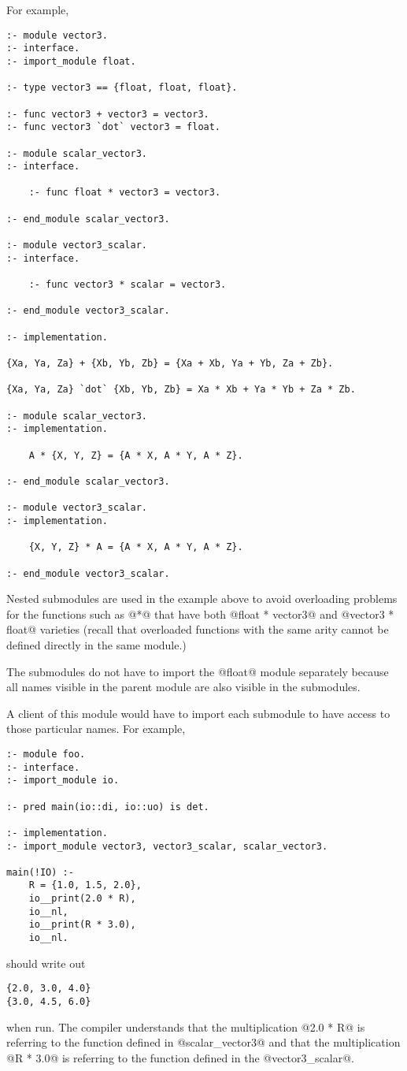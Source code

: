 For example,
\begin{verbatim}
:- module vector3.
:- interface.
:- import_module float.

:- type vector3 == {float, float, float}.

:- func vector3 + vector3 = vector3.
:- func vector3 `dot` vector3 = float.

:- module scalar_vector3.
:- interface.

    :- func float * vector3 = vector3.

:- end_module scalar_vector3.

:- module vector3_scalar.
:- interface.

    :- func vector3 * scalar = vector3.

:- end_module vector3_scalar.
    
:- implementation.

{Xa, Ya, Za} + {Xb, Yb, Zb} = {Xa + Xb, Ya + Yb, Za + Zb}.

{Xa, Ya, Za} `dot` {Xb, Yb, Zb} = Xa * Xb + Ya * Yb + Za * Zb.

:- module scalar_vector3.
:- implementation.

    A * {X, Y, Z} = {A * X, A * Y, A * Z}.

:- end_module scalar_vector3.

:- module vector3_scalar.
:- implementation.

    {X, Y, Z} * A = {A * X, A * Y, A * Z}.

:- end_module vector3_scalar.
\end{verbatim}
Nested submodules are used in the example above to avoid overloading
problems for the functions such as @*@ that have both @float * vector3@
and @vector3 * float@ varieties (recall that overloaded functions with
the same arity cannot be defined directly in the same module.)

The submodules do not have to import the @float@ module separately
because all names visible in the parent module are also visible in the
submodules.

A client of this module would have to import each submodule to have
access to those particular names.  For example,
\begin{verbatim}
:- module foo.
:- interface.
:- import_module io.

:- pred main(io::di, io::uo) is det.

:- implementation.
:- import_module vector3, vector3_scalar, scalar_vector3.

main(!IO) :-
    R = {1.0, 1.5, 2.0},
    io__print(2.0 * R),
    io__nl,
    io__print(R * 3.0),
    io__nl.
\end{verbatim}
should write out
\begin{verbatim}
{2.0, 3.0, 4.0}
{3.0, 4.5, 6.0}
\end{verbatim}
when run.  The compiler understands that the multiplication @2.0 * R@
is referring to the function defined in @scalar_vector3@ and that the
multiplication @R * 3.0@ is referring to the function defined in the
@vector3_scalar@.


